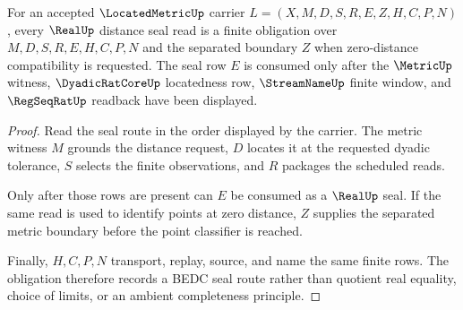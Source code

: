 \begin{theorem}
\label{thm:locatedmetric-real-seal-obligation}
For an accepted $\LocatedMetricUp$ carrier $L=(X,M,D,S,R,E,Z,H,C,P,N)$, every $\RealUp$ distance seal read is a finite obligation over $M,D,S,R,E,H,C,P,N$ and the separated boundary $Z$ when zero-distance compatibility is requested. The seal row $E$ is consumed only after the $\MetricUp$ witness, $\DyadicRatCoreUp$ locatedness row, $\StreamNameUp$ finite window, and $\RegSeqRatUp$ readback have been displayed.
\end{theorem}
\begin{proof}
Read the seal route in the order displayed by the carrier. The metric witness $M$ grounds the distance request, $D$ locates it at the requested dyadic tolerance, $S$ selects the finite observations, and $R$ packages the scheduled reads.

Only after those rows are present can $E$ be consumed as a $\RealUp$ seal. If the same read is used to identify points at zero distance, $Z$ supplies the separated metric boundary before the point classifier is reached.

Finally, $H,C,P,N$ transport, replay, source, and name the same finite rows. The obligation therefore records a BEDC seal route rather than quotient real equality, choice of limits, or an ambient completeness principle.
\end{proof}

